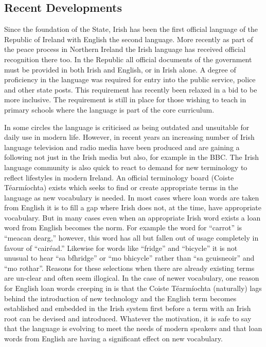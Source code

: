 \documentclass[]{../../metanetpaper}
\begin{document}
\begin{multicols}{2}
\subsection{Recent Developments}

Since the foundation of the State, Irish has been the first official language of the Republic of Ireland with English the second language. More recently as part of the peace process in Northern Ireland the Irish language has received official recognition there too. In the Republic all official documents of the government must be provided in both Irish and English, or in Irish alone. A degree of proficiency in the language was required for entry into the public service, police and other state posts. This requirement has recently been relaxed in a bid to be more inclusive. The requirement is still in place for those wishing to teach in primary schools where the language is part of the core curriculum.

In some circles the language is criticised as being outdated and unsuitable for daily use in modern life. However, in recent years an increasing number of Irish language television and radio media have been produced and are gaining a following not just in the Irish media but also, for example in the BBC. The Irish language community is also quick to react to demand for new terminology to reflect lifestyles in modern Ireland. An official terminology board (Coiste Téarmíochta) exists which seeks to find or create appropriate terms in the language as new vocabulary is needed. In most cases where loan words are taken from English it is to fill a gap where Irish does not, at the time, have appropriate vocabulary. But in many cases even when an appropriate Irish word exists a loan word from English becomes the norm. For example the word for “carrot” is ``meacan dearg,'' however, this word has all but fallen out of usage completely in favour of ``cairéad.'' Likewise for words like ``fridge'' and ``bicycle'' it is not unusual to hear ``sa bfhridge'' or ``mo bhicycle'' rather than ``sa gcuisneoir'' and ``mo rothar''. Reasons for these selections when there are already existing terms are un-clear and often seem illogical. In the case of newer vocabulary, one reason for English loan words creeping in is that the Coiste Téarmíochta (naturally) lags behind the introduction of new technology and the English term becomes established and embedded in the Irish system first before a term with an Irish root can be devised and introduced. Whatever the motivation, it is safe to say that the language is evolving to meet the needs of modern speakers and that loan words from English are having a significant effect on new vocabulary.


\end{multicols}
\end{document}
